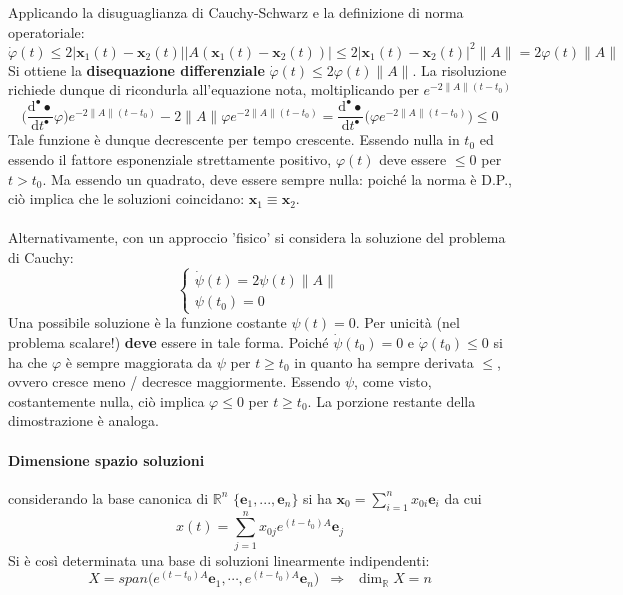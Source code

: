 \documentclass[10pt]{article}
\theoremstyle{plain}
\begin{document}
Applicando la disuguaglianza di Cauchy-Schwarz e la definizione di norma operatoriale: 
\[\dot{\varphi}(t) \leq 2 |\mathbf{x}_1(t) - \mathbf{x}_2(t)| |A(\mathbf{x}_1(t) - \mathbf{x}_2(t))| \leq 2 |\mathbf{x}_1(t) - \mathbf{x}_2(t)|^2 \|A\| = 2 \varphi(t) \|A\|\]
Si ottiene la \textbf{disequazione differenziale} $\displaystyle \dot{\varphi}(t) \leq 2 \varphi(t) \|A\|$. La risoluzione richiede dunque di ricondurla all'equazione nota, moltiplicando per $\displaystyle e^{-2\|A\|(t - t_0)}$
\[\big(\frac{\textrm{d}^{•} •}{\textrm{d}t^{•}}\varphi\big)e^{-2\|A\|(t - t_0)} - 2\|A\|\varphi e^{-2\|A\|(t - t_0)} = \frac{\textrm{d}^{•} •}{\textrm{d}t^{•}}\bigg(\varphi e^{-2\|A\|(t - t_0)}\bigg) \leq 0\]
Tale funzione è dunque decrescente per tempo crescente. Essendo nulla in $t_0$ ed essendo il fattore esponenziale strettamente positivo, $\varphi(t)$ deve essere $\leq 0$ per $t > t_0$. Ma essendo un quadrato, deve essere sempre nulla: poiché la norma è D.P., ciò implica che le soluzioni coincidano: $\mathbf{x}_1 \equiv \mathbf{x}_2$.
\\~\\Alternativamente, con un approccio 'fisico' si considera la soluzione del problema di Cauchy:
\[\begin{cases}
\dot{\psi}(t) = 2 \psi(t) \|A\| \\
\psi(t_0) = 0
\end{cases}\]
Una possibile soluzione è la funzione costante $\psi(t) = 0$. Per unicità (nel problema scalare!) \textbf{deve} essere in tale forma. Poiché $\dot{\psi}(t_0) = 0$ e $\dot{\varphi}(t_0) \leq 0$ si ha che $\varphi$ è sempre maggiorata da $\psi$ per $t \geq t_0$ in quanto ha sempre derivata $\leq$, ovvero cresce meno / decresce maggiormente. Essendo $\psi$, come visto, costantemente nulla, ciò implica $\varphi \leq 0$ per $t \geq t_0$. La porzione restante della dimostrazione è analoga.

\paragraph*{Dimensione spazio soluzioni} considerando la base canonica di $\mathbb{R}^n$ $\{\mathbf{e}_1, ..., \mathbf{e}_n\}$ si ha $\displaystyle \mathbf{x}_0 = \sum\limits_{i=1}^n x_{0i}\mathbf{e}_i$ da cui
\[x(t) = \sum\limits_{j=1}^n x_{0j}e^{\displaystyle (t - t_0)A}\mathbf{e}_j\]
Si è così determinata una base di soluzioni linearmente indipendenti:
\[X = span\big(e^{\displaystyle (t - t_0)A}\mathbf{e}_1, \cdots, e^{\displaystyle (t - t_0)A}\mathbf{e}_n\big) \enspace \Rightarrow \enspace \dim_{\mathbb{R}}X = n\]
\end{document}
